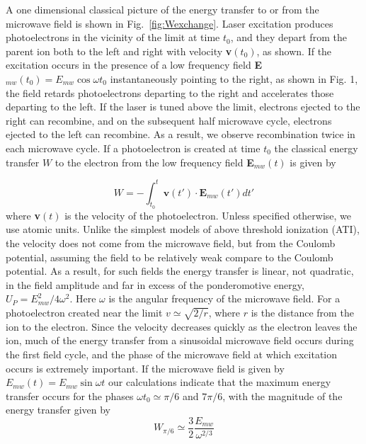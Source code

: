 \documentclass[pra, reprint]{revtex4-1}
\begin{document}
A one dimensional classical picture of the energy transfer to or from the microwave field is shown in Fig.~\ref{fig:Wexchange}. Laser excitation produces photoelectrons in the vicinity of the limit at time $t_0$, and they depart from the parent ion both to the left and right with velocity \textbf{v}$(t_0)$, as shown. If the excitation occurs in the presence of a low frequency field \textbf{E}${}_{mw}(t_0) = E_{mw} \cos{\omega t_0}$ instantaneously pointing to the right, as shown in Fig. 1, the field retards photoelectrons departing to the right and accelerates those departing to the left.
If the laser is tuned above the limit, electrons ejected to the right can recombine, and on the subsequent half microwave cycle, electrons ejected to the left can recombine. As a result, we observe recombination twice in each microwave cycle. If a photoelectron is created at time $t_0$ the classical energy transfer $W$ to the electron from the low frequency field \textbf{E}${}_{mw}(t)$ is given by\cite{Shuman_2008}

\begin{equation}
  \label{eq:work}
  W =- \int_{t_0}^t \textbf{v}(t') \cdot \textbf{E}_{mw}(t')dt'
\end{equation}
where \textbf{v}$(t)$ is the velocity of the photoelectron. Unless specified otherwise, we use atomic units. Unlike the simplest models of above threshold ionization (ATI)\cite{Multiphoton_processes_1988,Gallagher_1988,Corkum_1989}, the velocity does not come from the microwave field, but from the Coulomb potential, assuming the field to be relatively weak compare to the Coulomb potential. As a result, for such fields the energy transfer is linear, not quadratic, in the field amplitude and far in excess of the ponderomotive energy, $U_P=E_{mw}^2/4\omega^2$. Here $\omega$ is the angular frequency of the microwave field. For a photoelectron created near the limit $v\simeq \sqrt{2/r}$, where $r$ is the distance from the ion to the electron. Since the velocity decreases quickly as the electron leaves the ion, much of the energy transfer from a sinusoidal microwave field occurs during the first field cycle, and the phase of the microwave field at which excitation occurs is extremely important. If the microwave field is given by $E_{mw}(t)=E_{mw}\sin \omega t$ our calculations indicate that the maximum energy transfer occurs for the phases $\omega t_0 \simeq \pi/6$ and $7\pi/6$, with the magnitude of the energy transfer given by\cite{Shuman_2008}
\begin{equation}
  \label{eq:magW}
  W_{\pi/6}\simeq\frac{3}{2}\frac{E_{mw}}{\omega ^{2/3}}
\end{equation}
\end{document}
